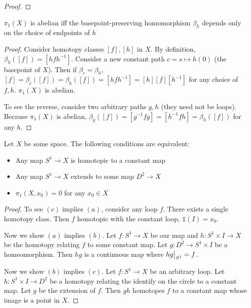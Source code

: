 \documentclass[10pt]{article}
\newcommand\restr[2]{{%
  \left.\kern-\nulldelimiterspace %
  #1 %
  \vphantom{\big|} %
  \right|_{#2} %
}}
\begin{document}
\begin{exercise}[]

\end{exercise}
\begin{proof}
\end{proof}

\begin{exercise}[1.1.3]
	$\pi_1(X)$ is abelian iff the basepoint-preserving homomorphism $\beta_h$ depends only on the choice of endpoints of $h$
\end{exercise}

\begin{proof}

	Consider homotopy classes $[f], [h]$ in $X$. By definition, $\beta_h([f]) = [hfh^{-1}]$. Consider a new constant path $c = s \mapsto h(0)$ (the basepoint of $X$). Then if $\beta_c = \beta_h$, $[f] = \beta_c([f]) = \beta_h([f]) = [hfh^{-1}] = [h][f][h^{-1}]$ for any choice of $f, h$. $\pi_1(X)$ is abelian.

	To see the reverse, consider two arbitrary paths $g, h$ (they need not be loops). Because $\pi_1(X)$ is abelian, $\beta_g([f]) = [g^{-1}fg] = [h^{-1}fh] = \beta_h([f])$ for any $h$.

\end{proof}

\begin{exercise}[1.1.5]
	Let $X$ be some space. The following conditions are equivalent:
	\begin{itemize}
		\item{Any map $S^1 \to X$ is homotopic to a constant map}
		\item{Any map $S^1 \to X$ extends to some map $D^2 \to X$}
		\item{$\pi_1(X, x_0) = 0$ for any $x_0 \in X$}
	\end{itemize}
\end{exercise}

\begin{proof}
	To see $(c)$ implies $(a)$, consider any loop $f$. There exists a single homotopy class. Then $f$ homotopic with the constant loop, $\mathds{1}(I) = x_0$.
	\par Now we show $(a)$ implies $(b)$. Let $f: S^1 \to X$ be our map and $h: S^1 \times I \to X$ be the homotopy relating $f$ to some constant map. Let $g: D^2 \to S^1 \times I$ be a homeomorphism. Then $hg$ is a continuous map where $\restr{hg}{S^1} = f$.
	\par Now we show $(b)$ implies $(c)$. Let $f: S^1 \to X$ be an arbitrary loop. Let $h: S^1 \times I \to D^2$ be a homotopy relating the identify on the circle to a constant map. Let $g$ be the extension of $f$. Then $gh$ homotopes $f$ to a constant map whose image is a point in $X$.
\end{proof}
\end{document}
